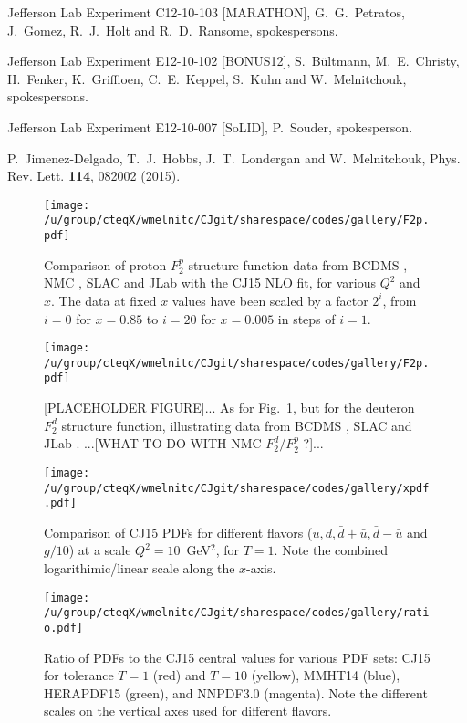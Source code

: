 \documentclass[aps,prd,amsmath,preprint]{revtex4}
\begin{document}
\begin{thebibliography}{99}
Jefferson Lab Experiment C12-10-103 [MARATHON],
G.~G.~Petratos, J.~Gomez, R.~J.~Holt and R.~D.~Ransome,
spokespersons.
 
Jefferson Lab Experiment E12-10-102 [BONUS12],
S.~B\"ultmann, M.~E.~Christy, H.~Fenker, K.~Griffioen, C.~E.~Keppel,
S.~Kuhn and W.~Melnitchouk,
spokespersons.
 
Jefferson Lab Experiment E12-10-007 [SoLID],
P.~Souder, spokesperson.

P.~Jimenez-Delgado, T.~J.~Hobbs, J.~T.~Londergan and W.~Melnitchouk,
Phys. Rev. Lett. {\bf 114}, 082002 (2015).

\end{thebibliography}


\begin{figure}[t]
\texttt{[image: /u/group/cteqX/wmelnitc/CJgit/sharespace/codes/gallery/F2p.pdf]}
\caption{Comparison of proton $F_2^p$ structure function data
	from BCDMS \cite{BCDMS}, NMC \cite{NMCp},
	SLAC \cite{SLAC} and JLab \cite{Malace}
	with the CJ15 NLO fit, for various $Q^2$ and $x$.
	The data at fixed $x$ values have been scaled by a factor
	$2^i$, from $i=0$ for $x=0.85$ to $i=20$ for $x=0.005$
	in steps of $i=1$.}
\label{fig:F2p}
\end{figure} 


\begin{figure}[t]
\texttt{[image: /u/group/cteqX/wmelnitc/CJgit/sharespace/codes/gallery/F2p.pdf]}
\caption{{\color{red}[PLACEHOLDER FIGURE]...}
	As for Fig.~\ref{fig:F2p}, but for the deuteron $F_2^d$
	structure function, illustrating data from BCDMS \cite{BCDMS},
	SLAC \cite{SLAC} and JLab \cite{Malace}.
	{\color{red}...[WHAT TO DO WITH NMC $F_2^d/F_2^p$ ?]...}}
\label{fig:F2d}
\end{figure} 


\begin{figure}[t]
\texttt{[image: /u/group/cteqX/wmelnitc/CJgit/sharespace/codes/gallery/xpdf.pdf]}
\caption{Comparison of CJ15 PDFs for different flavors
	($u, d, \bar d + \bar u, \bar d - \bar u$ and $g/10$)
	at a scale $Q^2=10$~GeV$^2$, for $T=1$.
	Note the combined logarithimic/linear scale along the $x$-axis.}
\label{fig:pdf}
\end{figure} 


\begin{figure}[t]
\texttt{[image: /u/group/cteqX/wmelnitc/CJgit/sharespace/codes/gallery/ratio.pdf]}
\caption{Ratio of PDFs to the CJ15 central values for various PDF sets:
	CJ15 for tolerance $T=1$ (red) and $T=10$ (yellow),
	MMHT14 \cite{MMHT14} (blue),
	HERAPDF15 \cite{HERAPDF15} (green), and
	NNPDF3.0 \cite{NNPDF3.0} (magenta).
	Note the different scales on the vertical axes used for
	different flavors.}
\label{fig:ratio}
\end{figure} 
\end{document}
